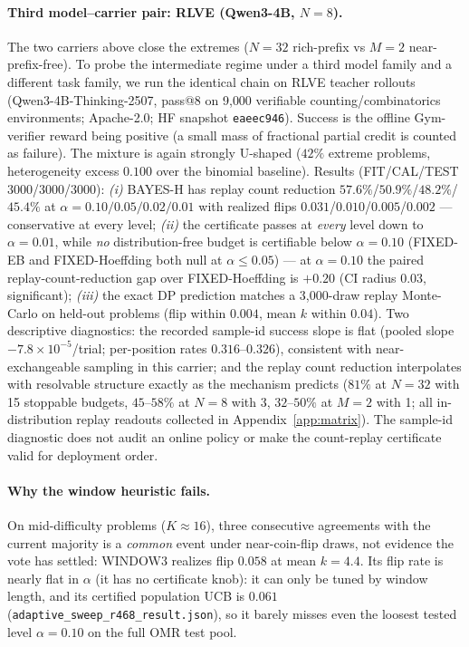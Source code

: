 \documentclass{article}
\theoremstyle{definition}
\theoremstyle{remark}
\begin{document}
\paragraph{Third model--carrier pair: RLVE (Qwen3-4B, $N=8$).} The two
carriers above close the extremes ($N{=}32$ rich-prefix vs $M{=}2$
near-prefix-free). To probe the intermediate regime under a third model
family and a different task family, we run the identical chain on RLVE
teacher rollouts (Qwen3-4B-Thinking-2507, pass@8 on 9{,}000 verifiable
counting/combinatorics environments; Apache-2.0; HF snapshot
\texttt{eaeec946}). Success is the offline Gym-verifier reward being positive
(a small mass of fractional partial credit is counted as failure). The
mixture is again strongly U-shaped ($42\%$ extreme problems, heterogeneity
excess $0.100$ over the binomial baseline). Results (FIT/CAL/TEST
3000/3000/3000): \emph{(i)} BAYES-H has replay count reduction $57.6\%$/$50.9\%$/$48.2\%$/$45.4\%$
at $\alpha=0.10/0.05/0.02/0.01$ with realized flips
$0.031$/$0.010$/$0.005$/$0.002$ --- conservative at every level;
\emph{(ii)} the certificate passes at \emph{every} level down to
$\alpha=0.01$, while \emph{no} distribution-free budget is certifiable below
$\alpha=0.10$ (FIXED-EB and FIXED-Hoeffding both null at
$\alpha\le0.05$) --- at $\alpha=0.10$ the paired replay-count-reduction gap over
FIXED-Hoeffding is $+0.20$ (CI radius $0.03$, significant); \emph{(iii)} the
exact DP prediction matches a 3{,}000-draw replay Monte-Carlo on held-out
problems (flip within $0.004$, mean $k$ within $0.04$). Two descriptive
diagnostics: the recorded sample-id success slope is flat
(pooled slope $-7.8\times10^{-5}$/trial; per-position rates $0.316$--$0.326$),
consistent with near-exchangeable sampling in this carrier; and the replay count reduction
interpolates with resolvable structure exactly as the mechanism predicts
($81\%$ at $N{=}32$ with 15 stoppable budgets, $45$--$58\%$ at $N{=}8$ with
3, $32$--$50\%$ at $M{=}2$ with 1; all in-distribution replay readouts collected in
Appendix~\ref{app:matrix}). The sample-id diagnostic does not audit an online
policy or make the count-replay certificate valid for deployment order.

\paragraph{Why the window heuristic fails.} On mid-difficulty problems
($K\approx16$), three consecutive agreements with the current majority is a
\emph{common} event under near-coin-flip draws, not evidence the vote has
settled: WINDOW3 realizes flip $0.058$ at mean $k=4.4$. Its flip rate is
nearly flat in $\alpha$ (it has no certificate knob): it can only be tuned by
window length, and its certified population UCB is $0.061$
(\texttt{adaptive\_sweep\_r468\_result.json}), so it barely misses even the
loosest tested level $\alpha=0.10$ on the full OMR test pool.
\end{document}
